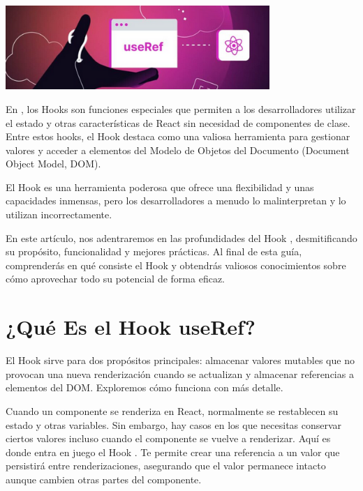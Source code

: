\graphicspath{{./assets/}}



\begin{center}
	\huge\textbf{}
	\vspace{0.5cm} %

	\includegraphics[width=10cm]{banner} %
	\vspace{0.5cm} %
\end{center}

En , los Hooks son funciones especiales que permiten a los desarrolladores utilizar el estado y otras características de React sin necesidad de componentes de clase. Entre estos hooks, el Hook  destaca como una valiosa herramienta para gestionar valores y acceder a elementos del Modelo de Objetos del Documento (Document Object Model, DOM).

El Hook  es una herramienta poderosa que ofrece una flexibilidad y unas capacidades inmensas, pero los desarrolladores a menudo lo malinterpretan y lo utilizan incorrectamente.

En este artículo, nos adentraremos en las profundidades del Hook , desmitificando su propósito, funcionalidad y mejores prácticas. Al final de esta guía, comprenderás en qué consiste el Hook y obtendrás valiosos conocimientos sobre cómo aprovechar todo su potencial de forma eficaz.

\section*{¿Qué Es el Hook useRef?}

El Hook  sirve para dos propósitos principales: almacenar valores mutables que no provocan una nueva renderización cuando se actualizan y almacenar referencias a elementos del DOM. Exploremos cómo funciona con más detalle.

Cuando un componente se renderiza en React, normalmente se restablecen su estado y otras variables. Sin embargo, hay casos en los que necesitas conservar ciertos valores incluso cuando el componente se vuelve a renderizar. Aquí es donde entra en juego el Hook . Te permite crear una referencia a un valor que persistirá entre renderizaciones, asegurando que el valor permanece intacto aunque cambien otras partes del componente.

